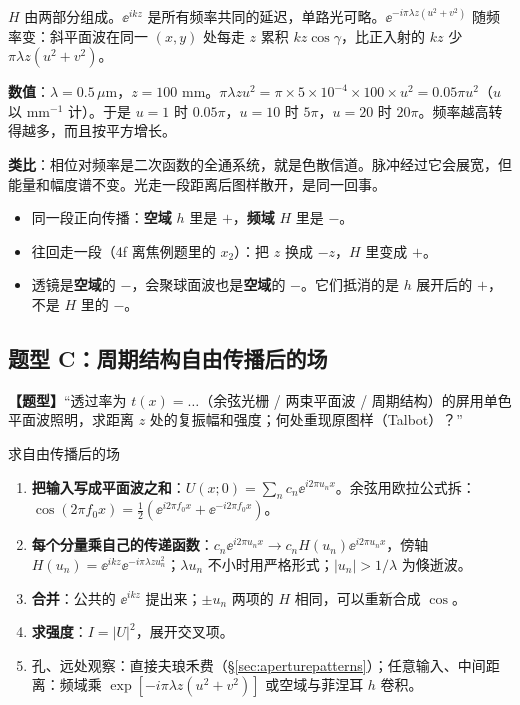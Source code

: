 \begin{idea}[传递函数里的相位是什么延迟]
$H$ 由两部分组成。$\ee^{ikz}$ 是所有频率共同的延迟，单路光可略。$\ee^{-i\pi\lambda z(u^2+v^2)}$ 随频率变：斜平面波在同一 $(x,y)$ 处每走 $z$ 累积 $kz\cos\gamma$，比正入射的 $kz$ 少 $\pi\lambda z(u^2+v^2)$。

\textbf{数值}：$\lambda=0.5\,\mu$m，$z=100$ mm。$\pi\lambda zu^2=\pi\times5\times10^{-4}\times100\times u^2=0.05\pi u^2$（$u$ 以 mm$^{-1}$ 计）。于是 $u=1$ 时 $0.05\pi$，$u=10$ 时 $5\pi$，$u=20$ 时 $20\pi$。频率越高转得越多，而且按平方增长。

\textbf{类比}：相位对频率是二次函数的全通系统，就是色散信道。脉冲经过它会展宽，但能量和幅度谱不变。光走一段距离后图样散开，是同一回事。
\end{idea}

\begin{warn}[二次相位的正负号]
\begin{itemize}
\item 同一段正向传播：\textbf{空域} $h$ 里是 $+$，\textbf{频域} $H$ 里是 $-$。
\item 往回走一段（4f 离焦例题里的 $x_2$）：把 $z$ 换成 $-z$，$H$ 里变成 $+$。
\item 透镜是\textbf{空域}的 $-$，会聚球面波也是\textbf{空域}的 $-$。它们抵消的是 $h$ 展开后的 $+$，不是 $H$ 里的 $-$。
\end{itemize}
\end{warn}

\subsection{题型 C：周期结构自由传播后的场}
\textbf{【题型】}“透过率为 $t(x)=\ldots$（余弦光栅 / 两束平面波 / 周期结构）的屏用单色平面波照明，求距离 $z$ 处的复振幅和强度；何处重现原图样（Talbot）？”

\begin{recipe}{求自由传播后的场}
\begin{enumerate}
\item \textbf{把输入写成平面波之和}：$U(x;0)=\sum_n c_n\ee^{i2\pi u_nx}$。余弦用欧拉公式拆：$\cos(2\pi f_0x)=\frac12(\ee^{i2\pi f_0x}+\ee^{-i2\pi f_0x})$。
\item \textbf{每个分量乘自己的传递函数}：$c_n\ee^{i2\pi u_nx}\to c_nH(u_n)\ee^{i2\pi u_nx}$，傍轴 $H(u_n)=\ee^{ikz}\ee^{-i\pi\lambda zu_n^2}$；$\lambda u_n$ 不小时用严格形式；$|u_n|>1/\lambda$ 为倏逝波。
\item \textbf{合并}：公共的 $\ee^{ikz}$ 提出来；$\pm u_n$ 两项的 $H$ 相同，可以重新合成 $\cos$。
\item \textbf{求强度}：$I=|U|^2$，展开交叉项。
\item 孔、远处观察：直接夫琅禾费（§\ref{sec:aperturepatterns}）；任意输入、中间距离：频域乘 $\exp[-i\pi\lambda z(u^2+v^2)]$ 或空域与菲涅耳 $h$ 卷积。
\end{enumerate}
\end{recipe}


